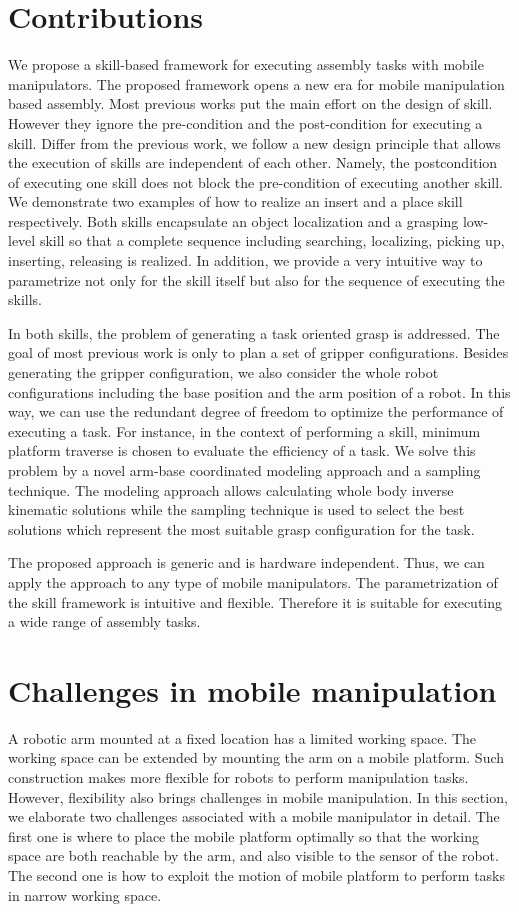 \section{Contributions}
We propose a skill-based framework for executing assembly tasks with mobile manipulators. The proposed framework opens a new era for mobile manipulation based assembly. Most previous works put the main effort on the design of skill. However they ignore the pre-condition and the post-condition for executing a skill. Differ from the previous work, we follow a new design principle that allows the execution of skills are independent of each other. Namely, the postcondition of executing one skill does not block the pre-condition of executing another skill. We demonstrate two examples of how to realize an insert and a place skill respectively. Both skills encapsulate an object localization and a grasping low-level skill so that a complete sequence including searching, localizing, picking up, inserting, releasing is realized. In addition, we provide a very intuitive way to parametrize not only for the skill itself but also for the sequence of executing the skills. 

In both skills, the problem of generating a task oriented grasp is addressed. The goal of most previous work is only to plan a set of gripper configurations. Besides generating the gripper configuration, we also consider the whole robot configurations including the base position and the arm position of  a robot. In this way, we can use the redundant degree of freedom to optimize the performance of executing a task. For instance, in the context of performing a skill, minimum platform traverse is chosen to evaluate the efficiency of a task. We solve this problem by a novel arm-base coordinated modeling approach and a sampling technique. The modeling approach allows calculating whole body inverse kinematic solutions while the sampling technique is used to select the best solutions which represent the most suitable grasp configuration for the task.  

The proposed approach is generic and is hardware independent. Thus, we can apply the approach to any type of mobile manipulators. The parametrization of the skill framework is intuitive and flexible. Therefore it is suitable for executing a wide range of assembly tasks.


\section{Challenges in mobile manipulation} \label{sec:challengesmb}
A robotic arm mounted at a fixed location has a limited working space. The working space can be extended by mounting the arm on a mobile platform. Such construction makes more flexible for robots to perform manipulation tasks. However, flexibility also brings challenges in mobile manipulation. In this section, we elaborate two challenges associated with a mobile manipulator in detail. The first one is where to place the mobile platform optimally so that the working space are both reachable by the arm, and also visible to the sensor of the robot. The second one is how to exploit the motion of mobile platform to perform tasks in narrow working space. 
  
